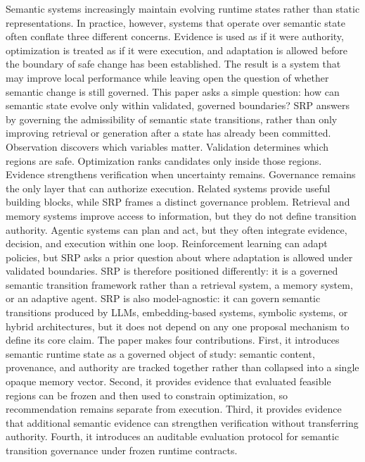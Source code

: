 {}Semantic systems increasingly maintain evolving runtime states rather than static representations. In practice, however, systems that operate over semantic state often conflate three different concerns. Evidence is used as if it were authority, optimization is treated as if it were execution, and adaptation is allowed before the boundary of safe change has been established. The result is a system that may improve local performance while leaving open the question of whether semantic change is still governed.\markdownRendererParagraphSeparator
{}This paper asks a simple question: how can semantic state evolve only within validated, governed boundaries? SRP answers by governing the admissibility of semantic state transitions, rather than only improving retrieval or generation after a state has already been committed. Observation discovers which variables matter. Validation determines which regions are safe. Optimization ranks candidates only inside those regions. Evidence strengthens verification when uncertainty remains. Governance remains the only layer that can authorize execution.\markdownRendererParagraphSeparator
{}Related systems provide useful building blocks, while SRP frames a distinct governance problem. Retrieval and memory systems improve access to information, but they do not define transition authority. Agentic systems can plan and act, but they often integrate evidence, decision, and execution within one loop. Reinforcement learning can adapt policies, but SRP asks a prior question about where adaptation is allowed under validated boundaries. SRP is therefore positioned differently: it is a governed semantic transition framework rather than a retrieval system, a memory system, or an adaptive agent.\markdownRendererParagraphSeparator
{}SRP is also model-agnostic: it can govern semantic transitions produced by LLMs, embedding-based systems, symbolic systems, or hybrid architectures, but it does not depend on any one proposal mechanism to define its core claim.\markdownRendererParagraphSeparator
{}The paper makes four contributions. First, it introduces semantic runtime state as a governed object of study: semantic content, provenance, and authority are tracked together rather than collapsed into a single opaque memory vector. Second, it provides evidence that evaluated feasible regions can be frozen and then used to constrain optimization, so recommendation remains separate from execution. Third, it provides evidence that additional semantic evidence can strengthen verification without transferring authority. Fourth, it introduces an auditable evaluation protocol for semantic transition governance under frozen runtime contracts.\markdownRendererParagraphSeparator
